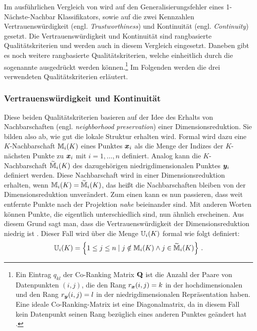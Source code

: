 Im ausführlichen Vergleich von \textcite{vanderMaaten.2009} wird auf den Generalisierungsfehler
eines 1-Nächste-Nachbar Klassifikators, sowie auf die zwei Kennzahlen Vertrauenswürdigkeit (engl.
\textit{Trustworthiness}) und Kontinuität (engl. \textit{Continuity}) \parencites{Venna.2001}{Venna.2006} gesetzt. Die Vertrauenswürdigkeit und Kontinuität sind rangbasierte
Qualitätskriterien und werden auch in diesem Vergleich eingesetzt. Daneben gibt es noch weitere
rangbasierte Qualitätskriterien, welche einheitlich durch die sogenannte
 \parencite[1432]{Lee.2009} ausgedrückt werden können.\footnote{ Ein Eintrag $q_{kl}$ der Co-Ranking
	Matrix $\mathbf{Q}$ ist die Anzahl der Paare von Datenpunkten $(i, j)$, die den Rang $r_{\bm{x}}(i,
		j) = k$ in der hochdimensionalen und den Rang $r_{\bm{y}}(i, j) = l$ in der niedrigdimensionalen
	Repräsentation haben. Eine ideale Co-Ranking-Matrix ist eine Diagonalmatrix, da in diesem Fall kein
	Datenpunkt seinen Rang bezüglich eines anderen Punktes geändert hat \parencite[1432]{Lee.2009}.} Im Folgenden werden die drei verwendeten Qualitätskriterien erläutert.


\subsubsection{Vertrauenswürdigkeit und Kontinuität}
\label{ch:Vergleich:sec:Methodik:subsec:Qualitaetskriterien:TC}
Diese beiden Qualitätskriterien basieren auf der Idee des Erhalts von Nachbarschaften (engl.
\textit{neighborhood preservation}) einer Dimensionsreduktion. Sie bilden also ab, wie gut die
lokale Struktur erhalten wird. Formal wird dazu eine $K$-Nachbarschaft $\mathbb{M}_i(K)$ eines Punktes $\bm{x}_i$ als die Menge der Indizes der $K$-nächsten Punkte zu $\bm{x}_i$ mit $i = 1, \ldots, n$ definiert.
Analog kann die $K$-Nachbarschaft $\widetilde{\mathbb{M}}_i(K)$ des dazugehörigen niedrigdimensionalen
Punktes $\bm{y}_i$ definiert werden. Diese Nachbarschaft wird in einer Dimensionsreduktion
erhalten, wenn $\mathbb{M}_i(K) = \widetilde{\mathbb{M}}_i(K)$, das heißt die Nachbarschaften bleiben von
der Dimensionsreduktion unverändert. Zum einen kann es nun passieren, dass weit entfernte Punkte nach der Projektion \textit{nahe}
beieinander sind. Mit anderen Worten können Punkte, die eigentlich unterschiedlich sind, nun
ähnlich erscheinen. Aus diesem Grund sagt man, dass die Vertrauenswürdigkeit der
Dimensionsreduktion niedrig ist \parencite[486 -- 487]{Venna.2001}. Dieser Fall wird über die Menge $\mathbb{U}_i(K)$ formal wie folgt
definiert:
\begin{equation}
	\mathbb{U}_i(K) =  \left\{ 1 \leq j \leq n \mid j \notin \mathbb{M}_i(K) \land j \in \widetilde{\mathbb{M}}_i(K) \right\} \, .
\end{equation}

